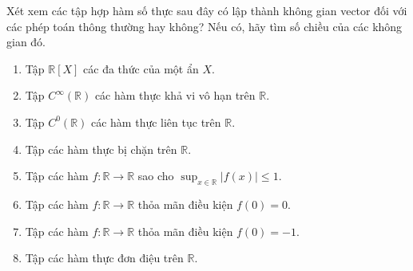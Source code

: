 \begin{exercise}
    Xét xem các tập hợp hàm số thực sau đây có lập thành không gian vector đối với các phép toán thông thường hay không? Nếu có, hãy tìm số chiều của các không gian đó.
    \begin{enumerate}[label={(\alph*)},itemsep=0pt]
        \item Tập $\mathbb{R}[X]$ các đa thức của một ẩn $X$.
        \item Tập $C^{\infty}(\mathbb{R})$ các hàm thực khả vi vô hạn trên $\mathbb{R}$.
        \item Tập $C^{0}(\mathbb{R})$ các hàm thực liên tục trên $\mathbb{R}$.
        \item Tập các hàm thực bị chặn trên $\mathbb{R}$.
        \item Tập các hàm $f: \mathbb{R}\rightarrow\mathbb{R}$ sao cho $\sup_{x\in\mathbb{R}}|f(x)| \le 1$.
        \item Tập các hàm $f: \mathbb{R}\rightarrow\mathbb{R}$ thỏa mãn điều kiện $f(0) = 0$.
        \item Tập các hàm $f: \mathbb{R}\rightarrow\mathbb{R}$ thỏa mãn điều kiện $f(0) = -1$.
        \item Tập các hàm thực đơn điệu trên $\mathbb{R}$.
    \end{enumerate}
\end{exercise}

